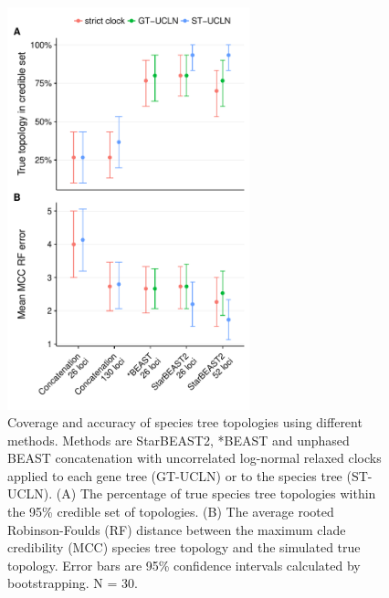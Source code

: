 \documentclass[12pt]{article}
\begin{document}
\begin{figure}[htb!]
\centering
\includegraphics[width=70mm]{topology_accuracy_unphased.pdf}
\caption
{Coverage and accuracy of species tree topologies using different methods.
Methods are StarBEAST2, *BEAST and unphased BEAST concatenation with uncorrelated
log-normal relaxed clocks applied to each gene tree (GT-UCLN) or to the species
tree (ST-UCLN). (A) The percentage of true species tree topologies within the
95\% credible set of topologies. (B) The average rooted Robinson-Foulds (RF)
distance between the maximum clade credibility (MCC) species tree topology and
the simulated true topology. Error bars are 95\% confidence intervals
calculated by bootstrapping. N = 30.}
\label{fig:treeTopologyError}
\end{figure}

\clearpage
\end{document}

